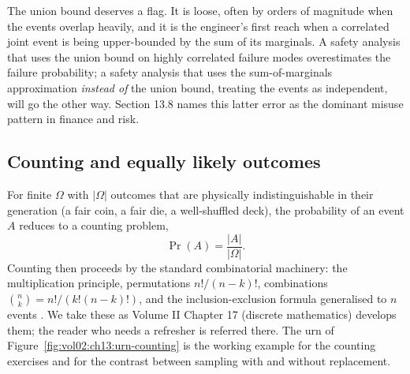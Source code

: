 The union bound deserves a flag. It is loose, often by orders of magnitude when the events
overlap heavily, and it is the engineer's first reach when a
correlated joint event is being upper-bounded by the sum of its
marginals. A safety analysis that uses the union bound on highly
correlated failure modes overestimates the failure probability; a
safety analysis that uses the sum-of-marginals approximation
\emph{instead of} the union bound, treating the events as
independent, will go the other way. Section 13.8 names this latter
error as the dominant misuse pattern in finance and risk.

\subsection{Counting and equally likely outcomes}

For finite $\Omega$ with $|\Omega|$ outcomes that are physically
indistinguishable in their generation (a fair coin, a fair die, a
well-shuffled deck), the probability of an event $A$ reduces to a
counting problem,
\[
\Pr(A) = \frac{|A|}{|\Omega|}.
\]
Counting then proceeds by the standard combinatorial machinery: the
multiplication principle, permutations $n!/(n-k)!$, combinations
$\binom{n}{k} = n!/(k!(n-k)!)$, and the inclusion-exclusion formula
generalised to $n$ events \cite[ch.~1]{text:ross-probability,text:v2ch13-feller-vol1}.
We take these as Volume II Chapter 17 (discrete mathematics) develops
them; the reader who needs a refresher is referred there. The urn of
Figure~\ref{fig:vol02:ch13:urn-counting} is the working example for
the counting exercises and for the contrast between sampling with
and without replacement.



